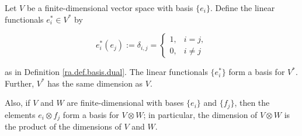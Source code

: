 \begin{remark}
\end{remark}

\begin{proposition}\label{ra.prop.basis.dual}

Let \(V\) be a finite-dimensional vector space with basis \(\{e_i\}\). Define the linear functionals \(e_i^* \in V^*\)  by 

\[
e_i^*(e_j) := \delta_{i,j} = \begin{cases}
1, & i = j, \\
0, & i \neq j
\end{cases}
\]  

as in Definition \ref{ra.def.basis.dual}. The linear functionals \(\{e_i^*\}\) form a basis for \(V^*\). Further, \(V^*\) has the same dimension as \(V\).

Also, if \(V\) and \(W\) are finite-dimensional with bases \(\{e_i\}\) and \(\{f_j\}\), then the elements \(e_i \otimes f_j\) form a basis for \(V \otimes W\); in particular, the dimension of \(V \otimes W\) is the product of the dimensions of \(V\) and \(W\).

\end{proposition}

